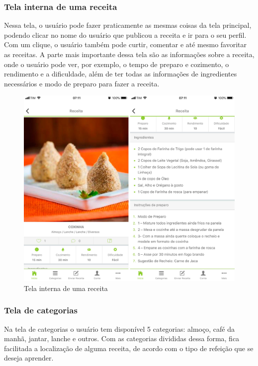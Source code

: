 \subsubsection{Tela interna de uma receita}
Nessa tela, o usuário pode fazer praticamente as mesmas coisas da tela principal, podendo clicar no nome do usuário que publicou a receita e ir para o seu perfil. Com um clique, o usuário também pode curtir, comentar e até mesmo favoritar as receitas. A parte mais importante dessa tela são as informações sobre a receita, onde o usuário pode ver, por exemplo, o tempo de preparo e cozimento, o rendimento e a dificuldade, além de ter todas as informações de ingredientes necessários e modo de preparo para fazer a receita.

\begin{figure}[H]
	\caption{\label{fig:tela-de-3}Tela interna de uma receita}
	\centering
	\includegraphics[scale=0.15]{imagens/figura14.jpg}
\end{figure}

\subsubsection{Tela de categorias}
Na tela de categorias o usuário tem disponível 5 categorias: almoço, café da manhã, jantar, lanche e outros. Com as categorias divididas dessa forma, fica facilitada a localização de alguma receita, de acordo com o tipo de refeição que se deseja  aprender.

